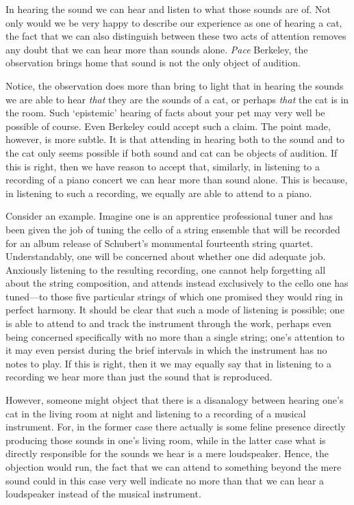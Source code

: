\documentclass[sloppy, journal, git, bytitle, dodraft]{humapap}
\begin{document}
In hearing the sound we can hear and listen to what those sounds are of. Not only would we be very happy to describe our experience as one of hearing a cat, the fact that we can also distinguish between these two acts of attention removes any doubt that we can hear more than sounds alone. \emph{Pace} Berkeley, the observation brings home that sound is not the only object of audition.  

Notice, the observation does more than bring to light that in hearing the sounds we are able to hear \emph{that} they are the sounds of a cat, or perhaps \emph{that} the cat is in the room. Such `epistemic' hearing of facts about your pet may very well be possible of course. Even Berkeley could accept such a claim. The point made, however, is more subtle. It is that attending in hearing both to the sound and to the cat only seems possible if both sound and cat can be objects of audition. If this is right, then we have reason to accept that, similarly, in listening to a recording of a piano concert we can hear more than sound alone. This is because, in listening to such a recording, we equally are able to attend to a piano. 

Consider an example. Imagine one is an apprentice professional tuner and has been given the job of tuning the cello of a string ensemble that will be recorded for an album release of Schubert's monumental fourteenth string quartet. Understandably, one will be concerned about whether one did adequate job. Anxiously listening to the resulting recording, one cannot help forgetting all about the string composition, and attends instead exclusively to the cello one has tuned---to those five particular strings of which one promised they would ring in perfect harmony. It should be clear that such a mode of listening is possible; one is able to attend to and track the instrument through the work, perhaps even being concerned specifically with no more than a single string; one's attention to it may even persist during the brief intervals in which the instrument has no notes to play. If this is right, then it we may equally say that in listening to a recording we hear more than just the sound that is reproduced.

However, someone might object that there is a disanalogy between hearing one's cat in the living room at night and listening to a recording of a musical instrument. For, in the former case there actually is some feline presence directly producing those sounds in one's living room, while in the latter case what is directly responsible for the sounds we hear is a mere loudspeaker. Hence, the objection would run, the fact that we can attend to something beyond the mere sound could in this case very well indicate no more than that we can hear a loudspeaker instead of the musical instrument. 
\end{document}
